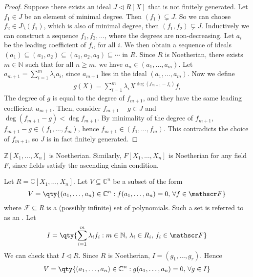 \begin{proof}
	Suppose there exists an ideal $J \triangleleft R[X]$ that is not finitely generated.
	Let $f_1 \in J$ be an element of minimal degree.
	Then $(f_1) \subsetneq J$.
	So we can choose $f_2 \in J \setminus (f_1)$, which is also of minimal degree, then $(f_1, f_2) \subsetneq J$.
	Inductively we can construct a sequence $f_1, f_2, \dots$, where the degrees are non-decreasing.
	Let $a_i$ be the leading coefficient of $f_i$, for all $i$.
	We then obtain a sequence of ideals $(a_1) \subseteq (a_1, a_2) \subseteq (a_1, a_2, a_3) \subseteq \cdots$ in $R$.
	Since $R$ is Noetherian, there exists $m \in \mathbb N$ such that for all $n \geq m$, we have $a_{n} \in (a_1, \dots, a_m)$.
	Let $a_{m+1} = \sum_{i=1}^m \lambda_i a_i$, since $a_{m+1}$ lies in the ideal $(a_1, \dots, a_m)$.
	Now we define
	\begin{align*}
		g(X) = \sum_{i=1}^m \lambda_i X^{\deg (f_{m+1} - f_i)} f_i
	\end{align*}
	The degree of $g$ is equal to the degree of $f_{m+1}$, and they have the same leading coefficient $a_{m+1}$.
	Then, consider $f_{m+1} - g \in J$ and $\deg (f_{m+1} - g) < \deg f_{m+1}$.
	By minimality of the degree of $f_{m+1}$, $f_{m+1} - g \in (f_1, \dots, f_m)$, hence $f_{m+1} \in (f_1, \dots, f_m)$.
	This contradicts the choice of $f_{m+1}$, so $J$ is in fact finitely generated.
\end{proof}

\begin{corollary}
	$\mathbb Z[X_1, \dots, X_n]$ is Noetherian.
	Similarly, $F[X_1, \dots, X_n]$ is Noetherian for any field $F$, since fields satisfy the ascending chain condition.
\end{corollary}

\begin{example}
	Let $R = \mathbb C[X_1, \dots, X_n]$.
	Let $V \subseteq \mathbb C^n$ be a subset of the form
	\begin{align*}
		V = \qty{(a_1, \dots, a_n) \in \mathbb C^n : f(a_1, \dots, a_n) = 0,\,\forall f \in \mathscr F}
	\end{align*}
	where $\mathscr F \subseteq R$ is a (possibly infinite) set of polynomials.
	Such a set is referred to as an .
	Let
	\begin{align*}
		I = \qty{\sum_{i=1}^m \lambda_i f_i : m \in \mathbb N,\, \lambda_i \in R_i,\, f_i \in \mathscr F}
	\end{align*}
	We can check that $I \triangleleft R$.
	Since $R$ is Noetherian, $I = (g_1, \dots, g_r)$.
	Hence
	\begin{align*}
		V = \qty{(a_1, \dots, a_n) \in \mathbb C^n : g(a_1, \dots, a_n) = 0,\,\forall g \in I}
	\end{align*}
\end{example}


